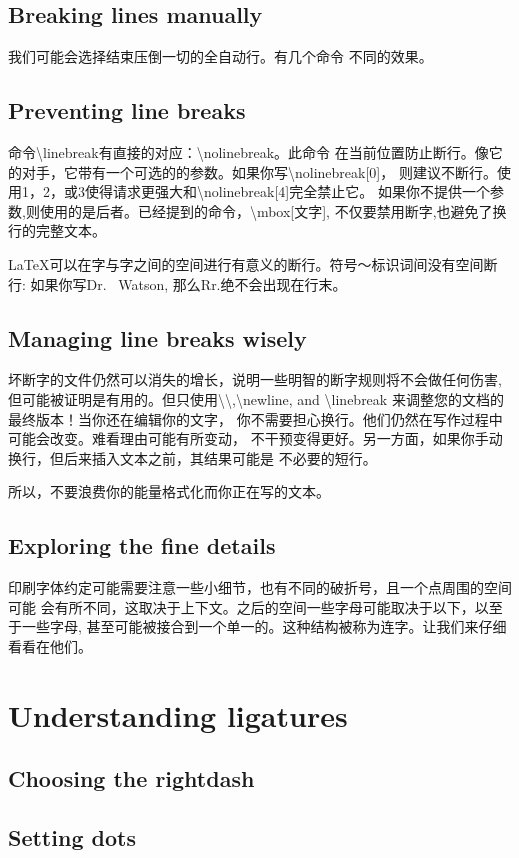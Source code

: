 \subsection{Breaking lines manually}
我们可能会选择结束压倒一切的全自动行。有几个命令
不同的效果。	
\subsection{Preventing line breaks}
命令\textbackslash linebreak有直接的对应：\textbackslash nolinebreak。此命令
在当前位置防止断行。像它的对手，它带有一个可选的的参数。如果你写\textbackslash nolinebreak[0]，
则建议不断行。使用1，2，或3使得请求更强大和\textbackslash nolinebreak[4]完全禁止它。
如果你不提供一个参数,则使用的是后者。已经提到的命令，\textbackslash mbox[文字],
不仅要禁用断字,也避免了换行的完整文本。	

LaTeX可以在字与字之间的空间进行有意义的断行。符号〜标识词间没有空间断行:
如果你写Dr. ~Watson, 那么Rr.绝不会出现在行末。
\subsection{Managing line breaks wisely}
坏断字的文件仍然可以消失的增长，说明一些明智的断字规则将不会做任何伤害,
但可能被证明是有用的。但只使用\textbackslash\textbackslash,\textbackslash newline,
and \textbackslash linebreak 来调整您的文档的最终版本！当你还在编辑你的文字，
你不需要担心换行。他们仍然在写作过程中可能会改变。难看理由可能有所变动，
不干预变得更好。另一方面，如果你手动换行，但后来插入文本之前，其结果可能是
不必要的短行。

所以，不要浪费你的能量格式化而你正在写的文本。	
\subsection{Exploring the fine details}
印刷字体约定可能需要注意一些小细节，也有不同的破折号，且一个点周围的空间可能
会有所不同，这取决于上下文。之后的空间一些字母可能取决于以下，以至于一些字母,
甚至可能被接合到一个单一的。这种结构被称为连字。让我们来仔细看看在他们。
\section{Understanding ligatures}
	\subsection{Choosing the rightdash}
	\subsection{Setting dots}
